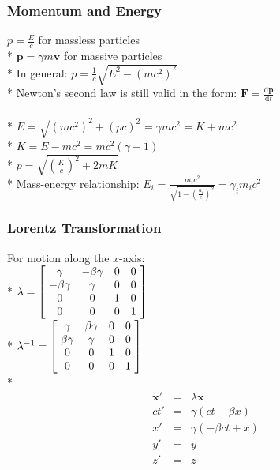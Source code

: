 \subsubsection{Momentum and Energy}
\(p=\frac{E}{c}\) for massless particles\\*
\(\mathbf{p}=\gamma m\mathbf{v}\) for massive particles\\*
In general: \(p=\frac{1}{c}\sqrt{E^2-\left(mc^2\right)^2}\)\\*
Newton's second law is still valid in the form: \(\displaystyle \mathbf{F}=\frac{\mathrm{d}\mathbf{p}}{\mathrm{d}t}\)\\\\*
%
\(E=\sqrt{\left(mc^2\right)^2+\left(pc\right)^2}=\gamma mc^2=K+mc^2\)\\*
\(K=E-mc^2=mc^2\left(\gamma-1\right)\)\\*
\(p=\sqrt{\left(\frac{K}{c}\right)^2+2mK}\)\\*
Mass-energy relationship: \(\displaystyle E_i=\frac{m_ic^2}{\sqrt{1-\left(\frac{u_i}{c}\right)^2}}=\gamma_im_ic^2\)

\subsubsection{Lorentz Transformation}
For motion along the \(x\)-axis:\\*
\(\lambda=\left[\!
  \begin{array}{ c c c c }
     \gamma & -\beta\gamma & 0 & 0 \\
     -\beta\gamma & \gamma & 0 & 0 \\
     0 & 0 & 1 & 0 \\
     0 & 0 & 0 & 1
  \end{array} \!\right]\)\\*
 \(\lambda^{-1}=\left[\!
  \begin{array}{ c c c c }
     \gamma & \beta\gamma & 0 & 0 \\
     \beta\gamma & \gamma & 0 & 0 \\
     0 & 0 & 1 & 0 \\
     0 & 0 & 0 & 1
  \end{array} \!\right]\)\\*
\begin{eqnarray}
\mathbf{x}'&=&\lambda\mathbf{x} \nonumber\\
ct'&=&\gamma\left(ct-\beta x\right) \nonumber\\
x'&=&\gamma\left(-\beta ct+x\right) \nonumber\\
y'&=&y \nonumber\\
z'&=&z \nonumber
\end{eqnarray}

